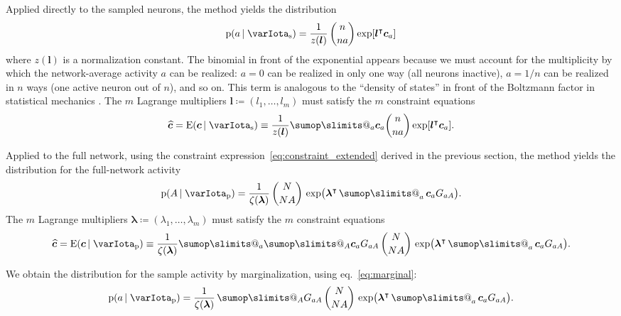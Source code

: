 \documentclass[\ifafour a4paper,12pt,\else a5paper,10pt,\fi%
onecolumn,oneside,article,%
british%
]{memoir}
\makeatletter
\theoremstyle{remark}
\theoremstyle{innote}
\def\sum{\DOTSI\sumop\slimits@}
\newcommand*{\citep}{\parencites}
\newcommand*{\defd}{\coloneqq}
\newcommand*{\pf}{\mathrm{p}}%
\newcommand*{\E}{\mathrm{E}}
\renewcommand*{\|}{\nonscript\,\vert\nonscript\;\mathopen{}}
\newcommand*{\chap}{ch.}%
\newcommand*{\eqn}{eq.}%
\newcommand*{\tsum}{\mathop{\textstyle\sum}\nolimits}
\newcommand*{\T}{^\intercal}%
\newcommand*{\ypp}{G}
\newcommand*{\yAv}{A}
\newcommand*{\yav}{a}
\newcommand*{\yNv}{N}
\newcommand*{\ya}{\yav}%
\newcommand*{\yA}{\yAv}%
\newcommand*{\yHa}{\varIota_\textrm{p}}
\newcommand*{\yHb}{\varIota_\textrm{s}}
\newcommand*{\yg}{\bm{c}}
\newcommand*{\yc}{\widehat{\bm{c}}}
\newcommand*{\yL}{\bm{\lambda}}
\newcommand*{\yl}{\bm{l}}
\newcommand*{\yk}{z}
\newcommand*{\yK}{\zeta}
\makeatother
\begin{document}
Applied directly to the sampled neurons, the method yields the distribution
\begin{equation}
  \label{eq:app_maxent_sample}
  \pf(\ya \|\yHb)
  =\frac{1}{\yk(\yl)}\,
  \binom{n}{n\ya}
  \exp[\yl\T \yg_{\ya}]
\end{equation}
where $\yk(\yl)$ is a normalization constant. The binomial in front of the
exponential appears because we must account for the multiplicity by which
the network-average activity $\ya$ can be realized: $\ya=0$ can be
realized in only one way (all neurons inactive), $\ya=1/n$ can be realized
in $n$ ways (one active neuron out of $n$), and so on. This term is analogous to
the \enquote{density of states} in front of the Boltzmann factor in
statistical mechanics \citep[\chap~16]{callen1960_r1985}. The $m$ Lagrange
multipliers $\yl\defd (l_1,\dotsc,l_m)$ must satisfy the $m$ constraint
equations
\begin{equation}
  \label{eq:app_maxent_sample_constraints}
  \yc = \E(\yg \|\yHb) \equiv
  \frac{1}{\yk(\yl)}\sum_{\ya}  \yg_{\ya} \binom{n}{n\ya}
  \exp[\yl\T \yg_{\ya}].%
\end{equation}

Applied to the full network, using the constraint
expression~\eqref{eq:constraint_extended} derived in the previous section,
the method yields the distribution for the full-network activity
\begin{equation}
  \label{eq:app_maxent_pop}
  \pf(\yA \| \yHa)  = \frac{1}{\yK(\yL)}\,
  \binom{\yNv}{\yNv \yA}\,\exp\bigl(\yL\T
  \tsum_{\ya} \yg_{\ya}\ypp_{\ya\yA}\bigr).
\end{equation}
The $m$ Lagrange multipliers $\yL\defd (\lambda_1,\dotsc,\lambda_m)$ must
satisfy the $m$ constraint equations
\begin{equation}
  \label{eq:app_maxent_pop_constraints}
  \yc = \E(\yg \|\yHa)\equiv %
 \frac{1}{\yK(\yL)}\sum_{\ya} \sum_{\yA} \yg_{\ya} \ypp_{\ya \yA}
\,
  \binom{\yNv}{\yNv \yA}\,\exp\bigl(\yL\T
  \tsum_{\ya} \yg_{\ya}\ypp_{\ya\yA}\bigr).
\end{equation}

We obtain the distribution for the sample activity by marginalization, using
\eqn~\eqref{eq:marginal}:
\begin{equation}
  \label{eq:app_maxent_pop_marg}
  \pf(\ya \| \yHa)  = \frac{1}{\yK(\yL)}\, 
  \sum_{\yA} \ypp_{\ya \yA}
\,
  \binom{\yNv}{\yNv \yA}\,\exp\bigl(\yL\T
  \tsum_{\ya} \yg_{\ya}\ypp_{\ya\yA}\bigr).
\end{equation}
\end{document}
